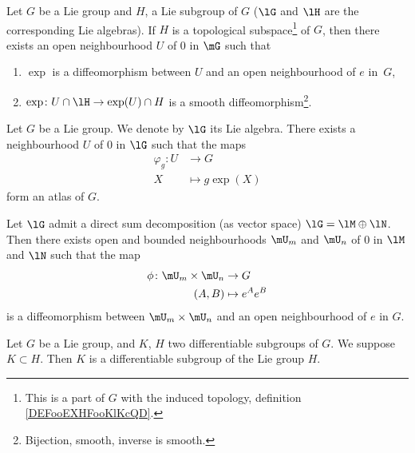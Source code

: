 \begin{lemma}       \label{LEMooOBIMooVvIDnb}
	Let $G$ be a Lie group and $H$, a Lie subgroup of $G$ ($\lG$ and $\lH$ are the corresponding Lie algebras). If $H$ is a topological subspace\footnote{This is a part of \( G\) with the induced topology, definition \ref{DEFooEXHFooKlKcQD}.} of $G$, then there exists an open neighbourhood $U$ of $0$ in $\mG$ such that
	\begin{enumerate}
		\item $\exp$ is a diffeomorphism between $U$ and an open neighbourhood of $e$ in~$G$,
		\item		\label{ITEMooVGGXooRIXOQc}
		      \( \exp\colon U\cap\lH\to \exp(U)\cap H\) is a smooth diffeomorphism\footnote{Bijection, smooth, inverse is smooth.}.
	\end{enumerate}
\end{lemma}

\begin{proposition}	\label{PROPooVMLTooFpXoeh}
	Let \( G\) be a Lie group. We denote by \( \lG\) its Lie algebra. There exists a neighbourhood \( U\) of \( 0\) in \( \lG\) such that the maps
	\begin{equation}
		\begin{aligned}
			\varphi_g\colon U & \to G            \\
			X                 & \mapsto g\exp(X)
		\end{aligned}
	\end{equation}
	form an atlas of \( G\).
\end{proposition}


\begin{lemma}  \label{LEMooEBQUooKXkCda}
	Let $\lG$ admit a direct sum decomposition (as vector space) $\lG=\lM\oplus\lN$. Then there exists open and bounded neighbourhoods $\mU_m$ and $\mU_n$ of $0$ in $\lM$ and $\lN$ such that the map
	\begin{equation}
		\begin{aligned}
			\phi \colon \mU_m\times\mU_n & \to G          \\
			(A,B)                        & \mapsto e^Ae^B
		\end{aligned}
	\end{equation}
	is a diffeomorphism between $\mU_m\times\mU_n$ and an open neighbourhood of $e$ in $G$.
\end{lemma}


\begin{corollary}
	Let $G$ be a Lie group, and $K$, $H$ two differentiable subgroups of $G$. We suppose $K\subset H$. Then $K$ is a differentiable subgroup of the Lie group $H$.
\end{corollary}


